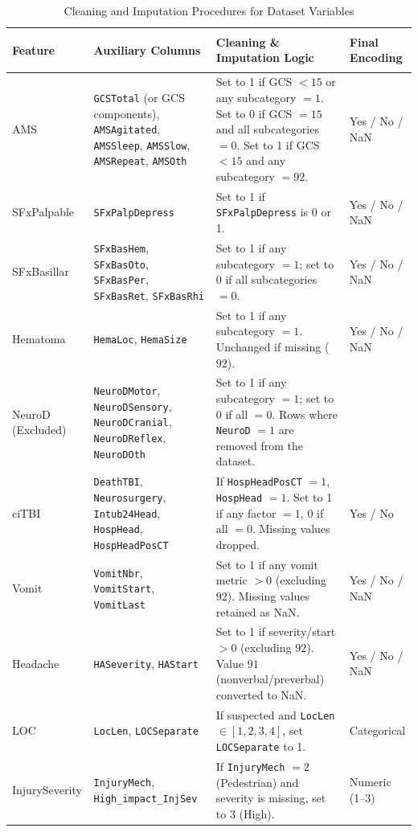 \documentclass[10pt,letterpaper]{article}
\begin{document}
\begin{small}
\begin{longtable}{p{3.0cm} p{3.5cm} p{5.5cm} p{2.5cm}}
\caption{Cleaning and Imputation Procedures for Dataset Variables} \\
\label{tab:data_cleaning}

\textbf{Feature} & \textbf{Auxiliary Columns} & \textbf{Cleaning \& Imputation Logic} & \textbf{Final Encoding} \\
\midrule
\endhead

\bottomrule
\endfoot

AMS & \texttt{GCSTotal} (or GCS components), \texttt{AMSAgitated}, \texttt{AMSSleep}, \texttt{AMSSlow}, \texttt{AMSRepeat}, \texttt{AMSOth} & Set to 1 if GCS $<15$ or any subcategory $=1$. Set to 0 if GCS $=15$ and all subcategories $=0$. Set to 1 if GCS $<15$ and any subcategory $=92$. & Yes / No / NaN \\
\midrule
SFxPalpable & \texttt{SFxPalpDepress} & Set to 1 if \texttt{SFxPalpDepress} is 0 or 1. & Yes / No / NaN \\
\midrule
SFxBasillar & \texttt{SFxBasHem}, \texttt{SFxBasOto}, \texttt{SFxBasPer}, \texttt{SFxBasRet}, \texttt{SFxBasRhi} & Set to 1 if any subcategory $=1$; set to 0 if all subcategories $=0$. & Yes / No / NaN \\
\midrule
Hematoma & \texttt{HemaLoc}, \texttt{HemaSize} & Set to 1 if any subcategory $=1$. Unchanged if missing ($92$). & Yes / No / NaN \\
\midrule
NeuroD (Excluded) & \texttt{NeuroDMotor}, \texttt{NeuroDSensory}, \texttt{NeuroDCranial}, \texttt{NeuroDReflex}, \texttt{NeuroDOth} & Set to 1 if any subcategory $=1$; set to 0 if all $=0$. Rows where \texttt{NeuroD} $= 1$ are removed from the dataset. & ~\\
\midrule
ciTBI & \texttt{DeathTBI}, \texttt{Neurosurgery}, \texttt{Intub24Head}, \texttt{HospHead}, \texttt{HospHeadPosCT} & If \texttt{HospHeadPosCT} $=1$, \texttt{HospHead} $=1$. Set to 1 if any factor $=1$, 0 if all $=0$. Missing values dropped. & Yes / No \\
\midrule
Vomit & \texttt{VomitNbr}, \texttt{VomitStart}, \texttt{VomitLast} & Set to 1 if any vomit metric $>0$ (excluding $92$). Missing values retained as NaN. & Yes / No / NaN \\
\midrule
Headache & \texttt{HASeverity}, \texttt{HAStart} & Set to 1 if severity/start $>0$ (excluding $92$). Value $91$ (nonverbal/preverbal) converted to NaN. & Yes / No / NaN \\
\midrule
LOC & \texttt{LocLen}, \texttt{LOCSeparate} & If suspected and \texttt{LocLen} $\in [1, 2, 3, 4]$, set \texttt{LOCSeparate} to 1. & Categorical \\
\midrule
InjurySeverity & \texttt{InjuryMech}, \texttt{High\_impact\_InjSev} & If \texttt{InjuryMech} $= 2$ (Pedestrian) and severity is missing, set to 3 (High). & Numeric (1--3) \\
\end{longtable}
\end{small}
\end{document}
